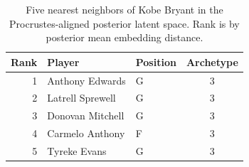 \begin{table}[htbp]
  \centering\small
  \begin{tabular}{rllc}
    \toprule
    Rank & Player & Position & Archetype \\
    \midrule
    1 & Anthony Edwards & G & 3 \\
    2 & Latrell Sprewell & G & 3 \\
    3 & Donovan Mitchell & G & 3 \\
    4 & Carmelo Anthony & F & 3 \\
    5 & Tyreke Evans & G & 3 \\
    \bottomrule
  \end{tabular}
  \caption{Five nearest neighbors of Kobe Bryant in the Procrustes-aligned posterior latent space. Rank is by posterior mean embedding distance.}
  \label{tab:Kobe_Bryant_neighbors}
\end{table}

